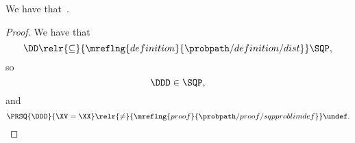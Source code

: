 \begin{proposition}
  We have that\ \problimdefprop.%
\end{proposition}

\begin{proof}
  We have that
  $$\DD \relr {\subseteq} {\mreflng{definition}{\probpath/definition/dist}} \SQP,$$
  so $$\DDD \in \SQP,$$
  and
  $$\PRSQ{\DDD}{\XV = \XX} \relr {\ne} {\mreflng{proof}{\probpath/proof/sqpproblimdef}} \undef.$$%
\end{proof}
